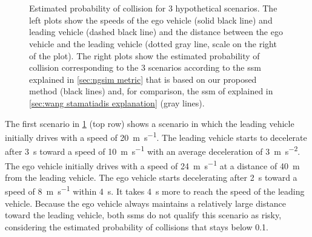 \setlength{\figurewidth}{.45\linewidth}
\setlength{\figureheight}{0.6\figurewidth}
\begin{figure}
	\centering
	
	\\
	
	\\
	
	
	\caption{Estimated probability of collision for 3 hypothetical scenarios. 
		The left plots show the speeds of the ego vehicle (solid black line) and leading vehicle (dashed black line) and the distance between the ego vehicle and the leading vehicle (dotted gray line, scale on the right of the plot).
		The right plots show the estimated probability of collision corresponding to the 3 scenarios according to the \ac{ssm} explained in \cref{sec:ngsim metric} that is based on our proposed method (black lines) and, for comparison, the \ac{ssm} of \textcite{wang2014evaluation} explained in \cref{sec:wang stamatiadis explanation} (gray lines).}
	\label{fig:scenarios}		
\end{figure}

The first scenario in \cref{fig:scenarios} (top row) shows a scenario in which the leading vehicle initially drives with a speed of \SI{20}{\meter\per\second}.
The leading vehicle starts to decelerate after \SI{3}{\second} toward a speed of \SI{10}{\meter\per\second} with an average deceleration of \SI{3}{\meter\per\second\squared}.
The ego vehicle initially drives with a speed of \SI{24}{\meter\per\second} at a distance of \SI{40}{\meter} from the leading vehicle.
The ego vehicle starts decelerating after \SI{2}{\second} toward a speed of \SI{8}{\meter\per\second} within \SI{4}{\second}.
It takes \SI{4}{\second} more to reach the speed of the leading vehicle.
Because the ego vehicle always maintains a relatively large distance toward the leading vehicle, both \acp{ssm} do not qualify this scenario as risky, considering the estimated probability of collisions that stays below 0.1.

